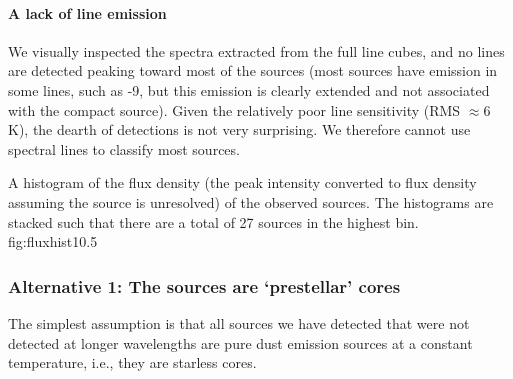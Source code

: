 \documentclass[twocolumn]{aastex61}
\begin{document}
\paragraph{A lack of line emission}
We visually inspected the spectra extracted from the full line cubes, and no
lines are detected peaking toward most of the sources (most sources
have emission in some lines, such as -9, but this emission is
clearly extended and not associated with the compact source).  Given the
relatively poor line sensitivity (RMS $\approx 6$ K), the dearth of detections
is not very surprising.  We therefore cannot use spectral lines to classify
most sources.



{A histogram of the flux density (the peak intensity converted to flux density
assuming the source is unresolved) of the observed sources. 
The histograms are stacked such that there are a total of 27 sources in the
highest bin.
}
{fig:fluxhist}{1}{0.5\textwidth}

\subsubsection{Alternative 1: The sources are `prestellar' cores}
\label{sec:alt0}
The simplest assumption is that all sources we have detected that were not
detected at longer wavelengths are pure dust emission sources at a constant
temperature, i.e., they are starless cores.
\end{document}
